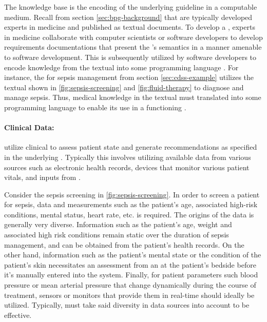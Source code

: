 The knowledge base is the encoding of the underlying guideline in a
computable medium. Recall from section \ref{sec:bpg-background}
that \BPGs{} are typically developed experts in medicine and published
as textual documents. To develop a \CDSS{}, experts in medicine
collaborate with computer scientists or software developers to
develop requirements documentations that present the \BPG{}'s
semantics in a manner amenable to software development.
This is subsequently utilized by software developers to encode
knowledge from the textual \BPG{} into some programming language \cite{PelegJBI13}.
For instance, the \CDSS{} for sepsis management from section \ref{sec:cdss-example}
utilizes the textual \BPG{} shown in \figurename{} \ref{fig:sepsis-screening}
and \figurename{} \ref{fig:fluid-therapy} to diagnose and manage sepsis.
Thus, medical knowledge in the textual \BPG{} must translated into some
programming language to enable its use in a functioning \CDSS{}.

\paragraph{Clinical Data:}

\CDSSs{} utilize clinical to assess patient state and
generate recommendations as specified in the underlying \BPG{}. Typically this involves
utilizing available data from various sources such as electronic health records,
devices that monitor various patient vitals, and inputs from \HCPs{}.

Consider the sepsis screening \BPG{} in \figurename{} \ref{fig:sepsis-screening}.
In order to screen a patient for sepsis, data and
measurements such as the patient's age, associated high-risk conditions,
mental status, heart rate, etc. is required. The origins
of the data is generally very diverse. Information such
as the patient's age, weight and associated high risk conditions
remain static over the duration of sepsis management, and can be
obtained from the patient's health records.
On the other hand, information such as the patient's mental
state or the condition of the patient's skin necessitates an assessment from an
\HCP{} at the patient's bedside before it's manually entered into the system.
Finally, for patient parameters such blood pressure or mean arterial pressure
that change dynamically during the course of treatment, sensors or monitors
that provide them in real-time should ideally be utilized.
Typically, \CDSS{} must take said diversity in data sources into account
to be effective.

